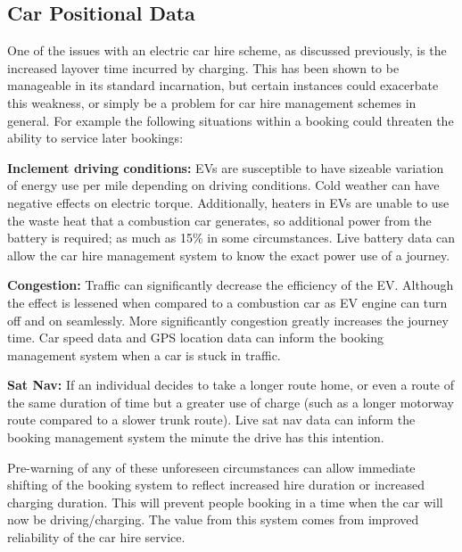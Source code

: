 \documentclass[conference]{IEEEtran}
\begin{document}


\subsection{Car Positional Data}

One of the issues with an electric car hire scheme, as discussed
previously, is the increased layover time incurred by charging. This
has been shown to be manageable in its standard incarnation, but
certain instances could exacerbate this weakness, or simply be a
problem for car hire management schemes in general. For example the
following situations within a booking could threaten the ability to
service later bookings:

\begin{compactenum}
\item {\textbf{Inclement driving conditions:}} EVs are susceptible to
  have sizeable variation of energy use per mile depending on driving
  conditions. Cold weather can have negative effects on electric
  torque. Additionally, heaters in EVs are unable to use the waste
  heat that a combustion car generates, so additional power from the
  battery is required; as much as 15\% in some circumstances. Live
  battery data can allow the car hire management system to know the
  exact power use of a journey.
\item {\textbf{Congestion:}} Traffic can significantly decrease the
  efficiency of the EV. Although the effect is lessened when compared
  to a combustion car as EV engine can turn off and on
  seamlessly. More significantly congestion greatly increases the
  journey time. Car speed data and GPS location data can inform the
  booking management system when a car is stuck in traffic.
\item {\textbf{Sat Nav:}} If an individual decides to take a longer
  route home, or even a route of the same duration of time but a
  greater use of charge (such as a longer motorway route compared to a
  slower trunk route). Live sat nav data can inform the booking
  management system the minute the drive has this intention. 
\end{compactenum}

Pre-warning of any of these unforeseen circumstances can allow
immediate shifting of the booking system to reflect increased hire
duration or increased charging duration. This will prevent people
booking in a time when the car will now be driving/charging. The value
from this system comes from improved reliability of the car hire
service.
\end{document}
